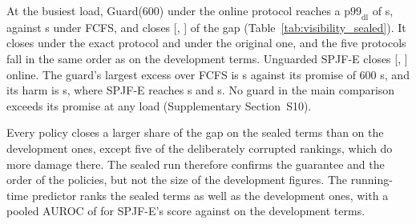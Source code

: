 At the busiest load, Guard(600) under the online protocol reaches a
$\mathrm{p99}_{\mathrm{dl}}$ of  s, against  s under FCFS,
and closes 
[, ] of the gap (Table~\ref{tab:visibility_sealed}). It closes
 under the exact protocol and  under the original one, and
the five protocols fall in the same order as on the development terms. Unguarded SPJF-E
closes  [, ] online. The guard's largest excess over FCFS is
 s against its promise of 600 s, and its harm is  s,
where SPJF-E reaches  s and  s. No guard in the
main comparison exceeds its promise at any load (Supplementary Section~S10).

Every policy closes a larger share of the gap on the sealed terms than on the development
ones, except five of the deliberately corrupted rankings, which do more damage there. The
sealed run therefore confirms the guarantee and the order of the policies, but not the
size of the development figures. The running-time predictor ranks the sealed
terms as well as the development ones, with a pooled AUROC of  for
SPJF-E's score against  on the development terms.

